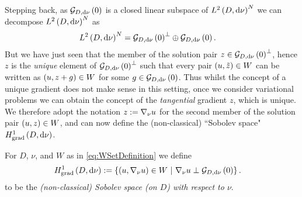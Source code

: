 Stepping back, as $\mathcal{G}_{ D, \mathrm{d}\nu}\left( 0 \right)$ is a closed linear subspace of $L^{2}\left( D,\mathrm{d}\nu \right)^N$ we can decompose $L^{2}\left( D,\mathrm{d}\nu \right)^N$ as
\begin{align*}
	L^{2}\left( D,\mathrm{d}\nu \right)^N &= \mathcal{G}_{ D, \mathrm{d}\nu}\left( 0 \right)^{\perp} \oplus \mathcal{G}_{ D, \mathrm{d}\nu}\left( 0 \right).
\end{align*}
But we have just seen that the member of the solution pair $z\in\mathcal{G}_{ D, \mathrm{d}\nu}\left( 0 \right)^{\perp}$, hence $z$ is the \textit{unique} element of $\mathcal{G}_{ D, \mathrm{d}\nu}\left( 0 \right)^{\perp}$ such that every pair $\left( u,\tilde{z} \right)\in W$ can be written as $\left( u,z+g \right)\in W$ for some $g\in\mathcal{G}_{ D, \mathrm{d}\nu}\left( 0 \right)$.
Thus whilst the concept of a unique gradient does not make sense in this setting, once we consider variational problems we can obtain the concept of the \textit{tangential} gradient $z$, which is unique.
We therefore adopt the notation $z := \nabla_\nu u$ for the second member of the solution pair $\left( u,z \right)\in W$, and can now define the (non-classical) ``Sobolev space" $H^1_\mathrm{grad}\left( D, \mathrm{d}\nu \right)$.
\begin{definition} \label{def:GradSobGeneral}
	For $D$, $\nu$, and $W$ as in \eqref{eq:WSetDefinition} we define
	\begin{align*}
		\gradSob{D}{\nu} &:= \clbracs{\bracs{u,\grad_\nu u}\in W \ \vert \ \grad_\nu u \perp \gradZero{D}{\nu}}.
	\end{align*}
	to be the \emph{(non-classical) Sobolev space (on $D$) with respect to $\nu$}.
\end{definition}


